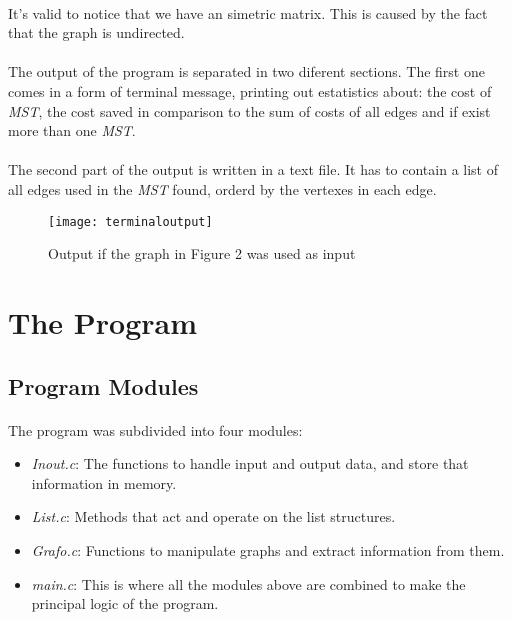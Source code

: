 \documentclass[titlepage]{article}
\begin{document}
    \paragraph{}
        It's valid to notice that we have an simetric matrix. This is caused by the fact that the graph is undirected. 
    \paragraph{}
        The output of the program is separated in two diferent sections. The first one comes in a form of terminal message, printing out estatistics about: the cost of \emph{MST}, the cost saved in comparison to the sum of costs of all edges and if exist more than one \emph{MST}.
        \paragraph{}
        The second part of the output is written in a text file. It has to contain a list of all edges used in the \emph{MST} found, orderd by the vertexes in each edge.
        \begin{figure}[h]
            \begin{center}
                \texttt{[image: terminaloutput]}
                \caption{Output if the graph in Figure 2 was used as input}
            \end{center}
        \end{figure}
    \section{The Program}
        \subsection{Program Modules}
        \paragraph{}
        The program was subdivided into four modules: 
        \begin{itemize}
            \item \emph{Inout.c}: The functions to handle input and output data, and store that information in memory.
            \item \emph{List.c}: Methods that act and operate on the list structures.
            \item \emph{Grafo.c}: Functions to manipulate graphs and extract information from them.
            \item \emph{main.c}: This is where all the modules above are combined to make the principal logic of the program.
        \end{itemize}
\end{document}

